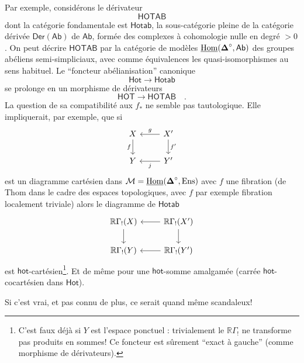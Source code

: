 \noindent{}Par exemple, considérons le dérivateur
\[
\mathsf{HOTAB}
\]
dont la catégorie fondamentale est $\mathsf{Hotab}$, la sous-catégorie pleine de la catégorie dérivée $\mathsf{Der}(\mathsf{Ab})$ de $\mathsf{Ab}$, formée des complexes à cohomologie nulle en degré $> 0$. On peut décrire $\mathsf{HOTAB}$ par la catégorie de modèles $\underline{\operatorname{Hom}}(\boldsymbol{\Delta}^\circ,\mathsf{Ab})$ des groupes abéliens semi-simpliciaux, avec comme équivalences les quasi-isomorphismes au sens habituel. Le “foncteur abélianisation” canonique
\[
\mathsf{Hot} \longrightarrow \mathsf{Hotab}
\]
se prolonge en un morphisme de dérivateurs
\[
\mathsf{HOT} \longrightarrow \mathsf{HOTAB} \quad .
\]
La question de sa compatibilité aux $f_*$ ne semble pas tautologique. Elle impliquerait, par exemple, que si
\[
\begin{tikzcd}
X \arrow[d, "f"'] & X' \arrow[l, "g"'] \arrow[d, "f'"] \\
Y & Y' \arrow[l, "j"]
\end{tikzcd}
\]
est un diagramme cartésien dans $\mathcal{M} = \underline{\operatorname{Hom}}(\boldsymbol{\Delta}^\circ,\mathrm{Ens})$ avec $f$ une fibration (de Thom dans le cadre des espaces topologiques, avec $f$ par exemple fibration localement triviale) alors le diagramme de $\mathsf{Hotab}$
\[
\begin{tikzcd}
\mathbb{R}\Gamma_!(X) \arrow[d] & \mathbb{R}\Gamma_!(X') \arrow[l] \arrow[d] \\
\mathbb{R}\Gamma_!(Y) & \mathbb{R}\Gamma_!(Y') \arrow[l]
\end{tikzcd}
\]
est $\mathsf{hot}$-cartésien\footnote[7]{C’est faux déjà si $Y$ est l’espace ponctuel : trivialement le $\mathbb{R}\Gamma_!$ ne transforme pas produits en sommes! Ce foncteur est sûrement “exact à gauche” (comme morphisme de dérivateurs).}. Et de même pour une $\mathsf{hot}$-somme amalgamée (carrée $\mathsf{hot}$-cocartésien dans $\mathsf{Hot}$). %

\noindent{}Si c’est vrai, et pas connu de plus, ce serait quand même scandaleux!

